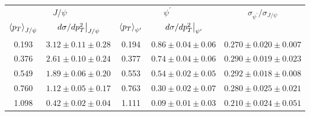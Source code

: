 \begin{tabular}{cc|cc|c}
\hline
\multicolumn{2}{c|}{$J/\psi$}                     & \multicolumn{2}{c|}{$\psi^{\prime}$}              & \multirow{2}{*}{$\sigma_{\psi^\prime}/\sigma_{J/\psi}$} \\ \cline{1-4}
$\expval{p_T}_{J/\psi}$ & $\eval{d\sigma/dp_T^2}_{J/\psi}$ & $\expval{p_T}_{\psi^\prime}$ & $\eval{d\sigma/dp_T^2}_{\psi^\prime}$ &  \\ \hline
\multicolumn{1}{c|}{0.193} & $3.12\pm0.11\pm0.28$ & \multicolumn{1}{c|}{0.194} & $0.86\pm0.04\pm0.06$ & $0.270\pm0.020\pm0.007$                                 \\
\multicolumn{1}{c|}{0.376} & $2.61\pm0.10\pm0.24$ & \multicolumn{1}{c|}{0.377} & $0.74\pm0.04\pm0.06$ & $0.290\pm0.019\pm0.023$                                 \\
\multicolumn{1}{c|}{0.549} & $1.89\pm0.06\pm0.20$ & \multicolumn{1}{c|}{0.553} & $0.54\pm0.02\pm0.05$ & $0.292\pm0.018\pm0.008$                                 \\
\multicolumn{1}{c|}{0.760} & $1.12\pm0.05\pm0.17$ & \multicolumn{1}{c|}{0.763} & $0.30\pm0.02\pm0.07$ & $0.280\pm0.025\pm0.021$                                 \\
\multicolumn{1}{c|}{1.098} & $0.42\pm0.02\pm0.04$ & \multicolumn{1}{c|}{1.111} & $0.09\pm0.01\pm0.03$ & $0.210\pm0.024\pm0.051$                                 \\ \hline
\end{tabular}
